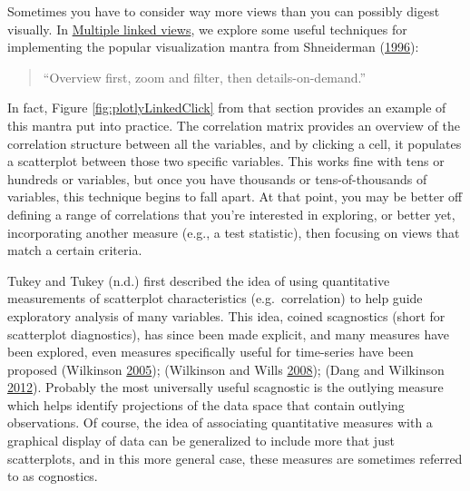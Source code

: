 \documentclass[12pt,]{isuthesis}
\begin{document}
Sometimes you have to consider way more views than you can possibly
digest visually. In \protect\hyperlink{multiple-linked-views}{Multiple
linked views}, we explore some useful techniques for implementing the
popular visualization mantra from Shneiderman
(\protect\hyperlink{ref-details-on-demand}{1996}):

\begin{quote}
``Overview first, zoom and filter, then details-on-demand.''
\end{quote}

In fact, Figure \ref{fig:plotlyLinkedClick} from that section provides
an example of this mantra put into practice. The correlation matrix
provides an overview of the correlation structure between all the
variables, and by clicking a cell, it populates a scatterplot between
those two specific variables. This works fine with tens or hundreds or
variables, but once you have thousands or tens-of-thousands of
variables, this technique begins to fall apart. At that point, you may
be better off defining a range of correlations that you're interested in
exploring, or better yet, incorporating another measure (e.g., a test
statistic), then focusing on views that match a certain criteria.

Tukey and Tukey (n.d.) first described the idea of using quantitative
measurements of scatterplot characteristics (e.g.~correlation) to help
guide exploratory analysis of many variables. This idea, coined
scagnostics (short for scatterplot diagnostics), has since been made
explicit, and many measures have been explored, even measures
specifically useful for time-series have been proposed (Wilkinson
\protect\hyperlink{ref-Wilkinson:2005}{2005}); (Wilkinson and Wills
\protect\hyperlink{ref-Wilkinson:2008}{2008}); (Dang and Wilkinson
\protect\hyperlink{ref-Wilkinson:2012}{2012}). Probably the most
universally useful scagnostic is the outlying measure which helps
identify projections of the data space that contain outlying
observations. Of course, the idea of associating quantitative measures
with a graphical display of data can be generalized to include more that
just scatterplots, and in this more general case, these measures are
sometimes referred to as cognostics.
\end{document}

